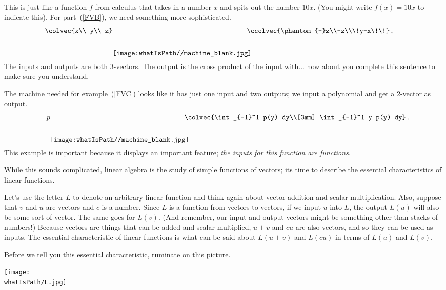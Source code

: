 This is just like a function $f$ from calculus that takes in a number $x$ and spits out the number $10x$. (You might write $f(x)=10x$ to indicate this).
For part~(\ref{FVB}), we need something more sophisticated. 
\[\!\!\!\!\!\!\!\!\!\colvec{x\\ y\\ z} \raisebox{-11mm}{\texttt{[image: \\whatIsPath//machine\_blank.jpg]} }\! \! \!\! \! \!\ccolvec{\phantom{-}z\\-z\\\!y-x\!\!}\, ,\]
The inputs and outputs are both 3-vectors. The output is the cross product of the input with... how about you complete this sentence to make sure you understand.

The machine needed for example~(\ref{FVC}) looks like it has just one input and two outputs; we input a polynomial and get a 2-vector as output.
\[\quad p \raisebox{-11mm}{\texttt{[image: \\whatIsPath//machine\_blank.jpg]} }\! \! \!\! \! \!\colvec{\int_{-1}^1  p(y) dy\\[3mm]
\int_{-1}^1 y p(y) dy}\, .\]
This example is important because it displays an important feature; 
{\itshape the inputs for this function are functions}.

While this sounds complicated, %
linear algebra is the
study of %
simple %
functions of vectors; its time to describe the essential characteristics of linear functions. 

Let's use the letter $L$ to denote an arbitrary linear function and think again about vector addition and scalar multiplication. 
Also,  suppose that $v$ and $u$ are vectors and $c$ is a number. 
Since $L$ is a function from vectors to vectors, if we input $u$ into $L$, the output $L(u)$ will also be some sort of vector. 
The same goes for 
$L(v)$.
(And remember, our input and output vectors might be something other than stacks of numbers!) 
Because vectors are things that can be added and scalar multiplied, 
$u+v$ and $cu$ are also vectors, and so they can be used as inputs.
The essential characteristic of linear functions is what can be said about 
$L(u+v)$ and $L(cu)$ in terms of 
$L(u)$ and $L(v)$. 

Before we tell you this essential characteristic, 
ruminate on this picture. 

\begin{center}
\texttt{[image: \\whatIsPath/L.jpg]}
\end{center}

